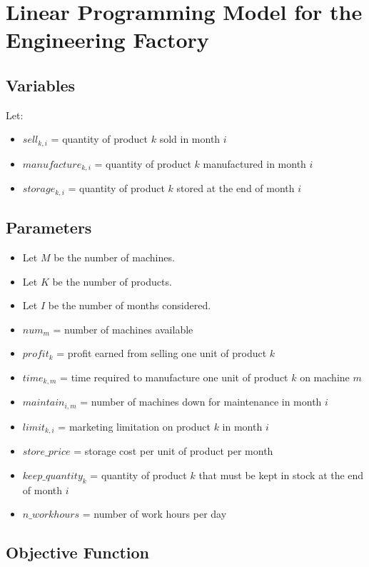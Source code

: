 \documentclass{article}
\begin{document}
\section*{Linear Programming Model for the Engineering Factory}

\subsection*{Variables}

Let:
\begin{itemize}
    \item $sell_{k,i}$ = quantity of product $k$ sold in month $i$
    \item $manufacture_{k,i}$ = quantity of product $k$ manufactured in month $i$
    \item $storage_{k,i}$ = quantity of product $k$ stored at the end of month $i$
\end{itemize}

\subsection*{Parameters}

\begin{itemize}
    \item Let $M$ be the number of machines.
    \item Let $K$ be the number of products.
    \item Let $I$ be the number of months considered.
    \item $num_m$ = number of machines available
    \item $profit_k$ = profit earned from selling one unit of product $k$
    \item $time_{k,m}$ = time required to manufacture one unit of product $k$ on machine $m$
    \item $maintain_{i,m}$ = number of machines down for maintenance in month $i$
    \item $limit_{k,i}$ = marketing limitation on product $k$ in month $i$
    \item $store\_price$ = storage cost per unit of product per month
    \item $keep\_quantity_k$ = quantity of product $k$ that must be kept in stock at the end of month $i$
    \item $n\_workhours$ = number of work hours per day
\end{itemize}

\subsection*{Objective Function}
\end{document}
